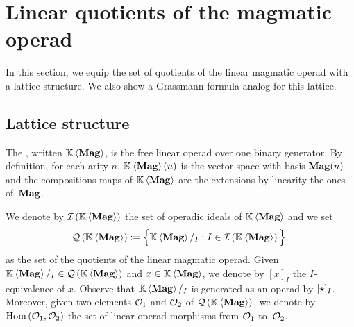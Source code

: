 \section{Linear quotients of the magmatic operad}
\label{sec:Magmatic_operads}
In this section, we equip the set of quotients of the linear magmatic
operad with a lattice structure. We also show a Grassmann formula
analog for this lattice.
\medbreak

\subsection{Lattice structure}
The , written $\KMag$, is the free linear
operad over one binary generator. By definition, for each arity $n$,
$\KMag(n)$ is the vector space with basis $\Mag(n)$ and the
compositions maps of $\KMag$ are the extensions by linearity the ones
of~$\Mag$.
\medbreak

We denote by $\IMag$ the set of operadic ideals of $\KMag$ and we set
\begin{equation} \label{equ:definition_of_QMag}
    \QMag := \Big\{\KMag/_I :  I\in\IMag\Big\},
\end{equation}
as the set of the quotients of the linear magmatic operad. Given
$\KMag/_I \in \QMag$ and $x \in \KMag$, we denote by $[x]_I$ the
$I$-equivalence of $x$. Observe that $\KMag/_I$ is generated as an
operad by $[\Product]_I$. Moreover, given two  elements $\Oca_1$ and
$\Oca_2$ of $\QMag$, we denote by $\Hom\left(\Oca_1,\Oca_2\right)$ the
set of linear operad morphisms from $\Oca_1$ to~$\Oca_2$.
\medbreak

